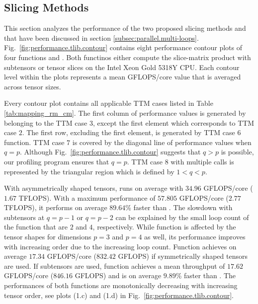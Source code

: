 \subsection{Slicing Methods}
\label{subsec:results.slicing-methods}
This section analyzes the performance of the two proposed slicing methods  and  that have been discussed in section \ref{subsec:parallel.multi-loops}.
Fig.~\ref{fig:performance.tlib.contour} contains eight performance contour plots of four  functions  and .
Both functinos either compute the slice-matrix product with subtensors  or tensor slices  on the Intel Xeon Gold 5318Y CPU.
Each contour level within the plots represents a mean GFLOPS/core value that is averaged across tensor sizes.

Every contour plot contains all applicable TTM cases listed in Table \ref{tab:mapping_rm_cm}.
The first column of performance values is generated by  belonging to the TTM case $3$, except the first element which corresponds to TTM case $2$.
The first row, excluding the first element, is generated by TTM case $6$ function.
TTM case $7$ is covered by the diagonal line of performance values when $q = p$.  
Although Fig.~\ref{fig:performance.tlib.contour} suggests that $q>p$ is possible, our profiling program ensures that $q=p$.
TTM case $8$ with multiple  calls is represented by the triangular region which is defined by $1<q<p$.


With asymmetrically shaped tensors,  runs on average with $34.96$ GFLOPS/core ($1.67$ TFLOPS).
With a maximum performance of $57.805$ GFLOPS/core ($2.77$ TFLOPS), it performs on average $89.64$\% faster than .
The slowdown with subtensors at $q=p-1$ or $q=p-2$ can be explained by the small loop count of the function that are $2$ and $4$, respectively.
While function  is affected by the tensor shapes for dimensions $p=3$ and $p=4$ as well, its performance improves with increasing order due to the increasing loop count.
Function  achieves on average $17.34$ GFLOPS/core ($832.42$ GFLOPS) if symmetrically shaped tensors are used.
If subtensors are used, function  achieves a mean throughput of $17.62$ GFLOPS/core ($846.16$ GFLOPS) and is on average $9.89$\% faster than .
The performances of both functions are monotonically decreasing with increasing tensor order, see plots (1.c) and (1.d) in Fig.~\ref{fig:performance.tlib.contour}.


